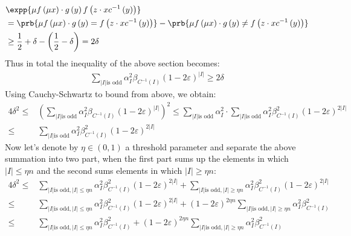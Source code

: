 \documentclass{article}
\begin{document}
\begin{equation*}
  \begin{split}
    & \expp{\mu f\left( \mu x \right) \cdot g\left( y \right)f\left(z \cdot x c^{-1}\left( y \right)  \right)} \\ 
    & = \prb{\mu f\left( \mu x \right) \cdot g\left( y \right) = f\left(z \cdot x c^{-1}\left( y \right)  \right)} -  \prb{\mu f\left( \mu x \right) \cdot g\left( y \right) \neq f\left(z \cdot x c^{-1}\left( y \right)  \right)} \\ 
   & \ge \frac{1}{2}+\delta - \left( \frac{1}{2} - \delta \right) = 2\delta
  \end{split}
\end{equation*}
Thus in total the inequality of the above section becomes: 
 \begin{equation*}
   \begin{split}
     \sum_{|I| \text{is odd} }{\alpha_{I}^{2}\beta_{C^{-1}(I)}  \left( 1 -2 \varepsilon \right)^{|I|}} \ge 2\delta 
   \end{split}
 \end{equation*}
Using Cauchy-Schwartz to bound from above, we obtain: 
\begin{equation*}
   \begin{split}
     4\delta^{2} \le & \left( \sum_{|I| \text{is odd} }{\alpha_{I}^{2}\beta_{C^{-1}(I)}  \left( 1 -2 \varepsilon \right)^{|I|}} \right)^{2}  \le  \sum_{|I| \text{is odd} }{ \alpha_{I}^{2}  } \cdot  \sum_{|I| \text{is odd} }{\alpha_{I}^{2}\beta_{C^{-1}(I)}^{2}  \left( 1 -2 \varepsilon \right)^{2|I|}} \\ 
    \le  &  \sum_{|I| \text{is odd} }{\alpha_{I}^{2}\beta_{C^{-1}(I)}^{2}  \left( 1 -2 \varepsilon \right)^{2|I|}} 
   \end{split}
 \end{equation*}
 Now let's denote by $\eta \in \left( 0,1 \right)$ a threshold parameter and separate the above summation into two part, when the first part sums up the elements in which $|I| \le \eta n$ and the second sums elements in which $|I| \ge \eta n$: 
 \begin{equation*}
   \begin{split}
     4\delta^{2} \le &  \sum_{|I| \text{is odd} , |I| \le \eta n  }{\alpha_{I}^{2}\beta_{C^{-1}(I)}^{2}  \left( 1 -2 \varepsilon \right)^{2|I|}} + \sum_{|I| \text{is odd} , |I| \ge \eta n  }{\alpha_{I}^{2}\beta_{C^{-1}(I)}^{2}  \left( 1 -2 \varepsilon \right)^{2|I|}} \\ 
     \le &  \sum_{|I| \text{is odd} , |I| \le \eta n  }{\alpha_{I}^{2}\beta_{C^{-1}(I)}^{2}  \left( 1 -2 \varepsilon \right)^{2|I|}} + \left( 1 -2 \varepsilon \right)^{2\eta n }\sum_{|I| \text{is odd} , |I| \ge \eta n  }{\alpha_{I}^{2}\beta_{C^{-1}(I)}^{2}  } \\ 
\le &  \sum_{|I| \text{is odd} , |I| \le \eta n  }{\alpha_{I}^{2}\beta_{C^{-1}(I)}^{2}} + \left( 1 -2 \varepsilon \right)^{2\eta n }\sum_{|I| \text{is odd} , |I| \ge \eta n  }{\alpha_{I}^{2}\beta_{C^{-1}(I)}^{2}  } 
   \end{split}
 \end{equation*}
\end{document}
